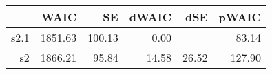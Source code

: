 \begin{table}[ht]
\centering
\begin{tabular}{rrrrrr}
  \hline
 & WAIC & SE & dWAIC & dSE & pWAIC \\ 
  \hline
s2.1 & 1851.63 & 100.13 & 0.00 &  & 83.14 \\ 
  s2 & 1866.21 & 95.84 & 14.58 & 26.52 & 127.90 \\ 
   \hline
\end{tabular}
\end{table}
